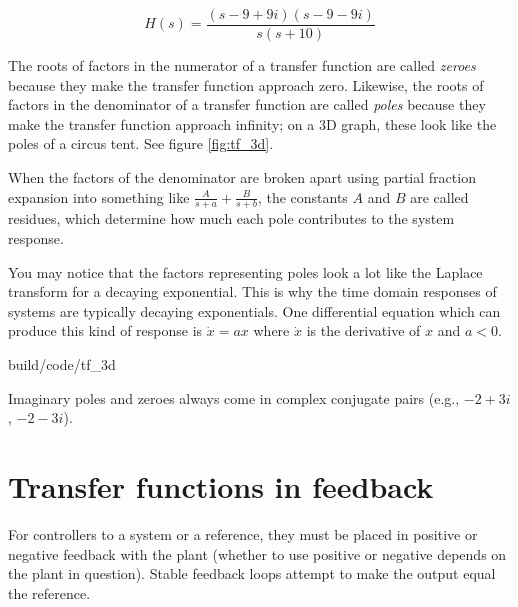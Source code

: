 \begin{equation} \label{eq:transfer_func}
  H(s) = \frac{(s-9+9i)(s-9-9i)}{s(s+10)}
\end{equation}

The roots of factors in the numerator of a transfer function are called
\textit{zeroes} because they make the transfer function approach zero. Likewise,
the roots of factors in the denominator of a transfer function are called
\textit{poles} because they make the transfer function approach infinity; on a
3D graph, these look like the poles of a circus tent. See figure
\ref{fig:tf_3d}.

When the factors of the denominator are broken apart using partial fraction
expansion into something like $\frac{A}{s + a} + \frac{B}{s + b}$, the constants
$A$ and $B$ are called residues, which determine how much each pole contributes
to the system response.

You may notice that the factors representing poles look a lot like the Laplace
transform for a decaying exponential. This is why the time domain responses of
systems are typically decaying exponentials. One differential equation which can
produce this kind of response is $\dot{x} = ax$ where $\dot{x}$ is the
derivative of $x$ and $a < 0$.

\begin{svg}{build/code/tf_3d}
  \caption{Equation \ref{eq:transfer_func} plotted in 3D}
  \label{fig:tf_3d}
\end{svg}

\begin{remark}
  Imaginary poles and zeroes always come in complex conjugate pairs (e.g.,
  $-2 + 3i$, $-2 - 3i$).
\end{remark}

\section{Transfer functions in feedback}

For \glspl{controller} to  a system or
 a reference, they must be placed in positive or
negative feedback with the \gls{plant} (whether to use positive or negative
depends on the \gls{plant} in question). Stable feedback loops attempt to make
the \gls{output} equal the \gls{reference}.

